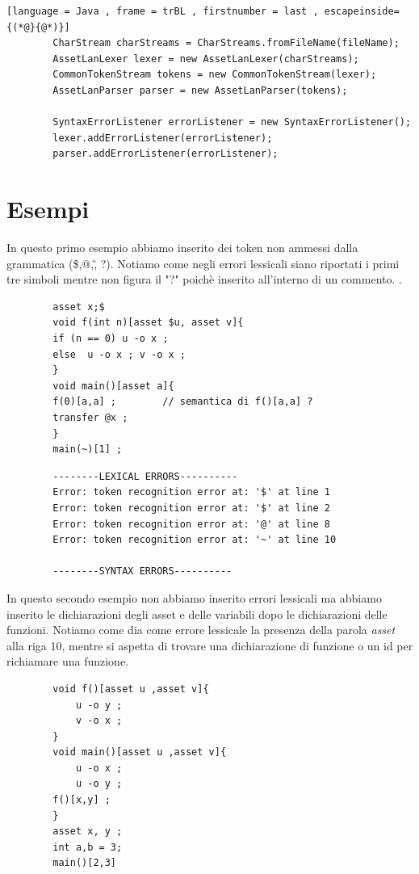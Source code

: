 \documentclass[12pt, a4paper]{report}
\begin{document}
    \begin{lstlisting}[language = Java , frame = trBL , firstnumber = last , escapeinside={(*@}{@*)}]
        CharStream charStreams = CharStreams.fromFileName(fileName);
        AssetLanLexer lexer = new AssetLanLexer(charStreams);
        CommonTokenStream tokens = new CommonTokenStream(lexer);
        AssetLanParser parser = new AssetLanParser(tokens);

        SyntaxErrorListener errorListener = new SyntaxErrorListener();
        lexer.addErrorListener(errorListener);
        parser.addErrorListener(errorListener);
    \end{lstlisting}
    \section{Esempi}
    In questo primo esempio abbiamo inserito dei token non ammessi dalla grammatica (\$,@,\~, ?). Notiamo come negli errori lessicali siano riportati i primi tre simboli mentre non figura il "?" poichè inserito all'interno di un commento. . 
    \begin{lstlisting}
        asset x;$
        void f(int n)[asset $u, asset v]{
        if (n == 0) u -o x ;
        else  u -o x ; v -o x ;
        }
        void main()[asset a]{
        f(0)[a,a] ;        // semantica di f()[a,a] ?
        transfer @x ;
        }
        main(~)[1] ;
    \end{lstlisting}
   \begin{lstlisting}
        --------LEXICAL ERRORS----------
        Error: token recognition error at: '$' at line 1
        Error: token recognition error at: '$' at line 2
        Error: token recognition error at: '@' at line 8
        Error: token recognition error at: '~' at line 10

        --------SYNTAX ERRORS----------
       \end{lstlisting}
   In questo secondo esempio non abbiamo inserito errori lessicali ma abbiamo inserito le dichiarazioni degli asset e delle variabili dopo le dichiarazioni delle funzioni. Notiamo come dia come errore lessicale la presenza della parola \emph{asset} alla riga 10, mentre si aspetta di trovare una dichiarazione di funzione o un id per richiamare una funzione.
   
    \begin{lstlisting}
        void f()[asset u ,asset v]{
            u -o y ;
            v -o x ;
        }
        void main()[asset u ,asset v]{
            u -o x ;
            u -o y ;
        f()[x,y] ;
        }
        asset x, y ;
        int a,b = 3;
        main()[2,3]
    \end{lstlisting}
    
\end{document}
